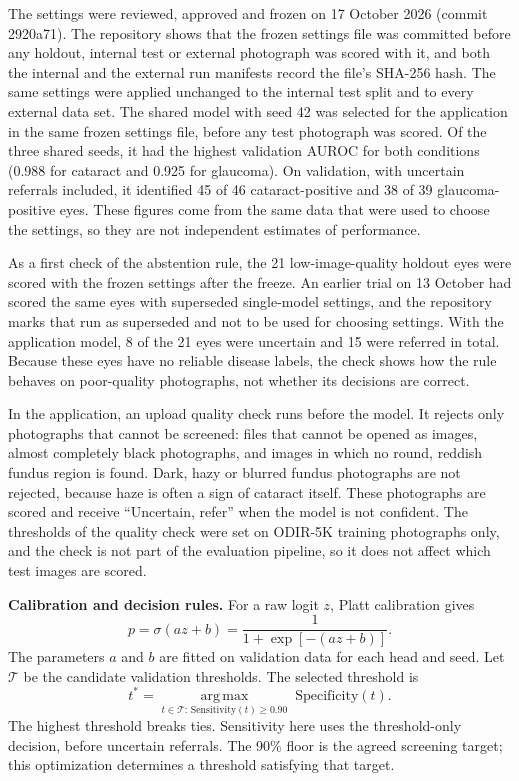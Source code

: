 \documentclass[conference,a4paper]{IEEEtran}
\newcommand{\peachaddition}[1]{%
  \par\smallskip\noindent
  \begingroup\setlength{\fboxsep}{5pt}%
  \colorbox{reviewpeach}{\begin{minipage}{\dimexpr\linewidth-2\fboxsep\relax}
  #1
  \end{minipage}}\endgroup\par\smallskip
}
\begin{document}
The settings were reviewed, approved and frozen on 17 October 2026 (commit 2920a71). The repository
shows that the frozen settings file was committed before any holdout, internal test or external
photograph was scored with it, and both the internal and the external run manifests record the
file's SHA-256 hash. The same settings were applied unchanged to the internal test split and to
every external data set. The shared model with seed 42 was selected for the application in the same
frozen settings file, before any test photograph was scored. Of the three shared seeds, it had the
highest validation AUROC for both conditions (0.988 for cataract and 0.925 for glaucoma). On
validation, with uncertain referrals included, it identified 45 of 46 cataract-positive and 38 of 39
glaucoma-positive eyes. These figures come from the same data that were used to choose the settings,
so they are not independent estimates of performance.

As a first check of the abstention rule, the 21 low-image-quality holdout eyes were scored with the
frozen settings after the freeze. An earlier trial on 13 October had scored the same eyes with
superseded single-model settings, and the repository marks that run as superseded and not to be used
for choosing settings. With the application model, 8 of the 21 eyes were uncertain and 15 were
referred in total. Because these eyes have no reliable disease labels, the check shows how the rule
behaves on poor-quality photographs, not whether its decisions are correct.

In the application, an upload quality check runs before the model. It rejects only photographs that
cannot be screened: files that cannot be opened as images, almost completely black photographs, and
images in which no round, reddish fundus region is found. Dark, hazy or blurred fundus photographs
are not rejected, because haze is often a sign of cataract itself. These photographs are scored and
receive ``Uncertain, refer'' when the model is not confident. The thresholds of the quality check
were set on ODIR-5K training photographs only, and the check is not part of the evaluation pipeline,
so it does not affect which test images are scored.


\peachaddition{
\textbf{Calibration and decision rules.}
For a raw logit $z$, Platt calibration gives
\[
p=\sigma(az+b)=\frac{1}{1+\exp[-(az+b)]}.
\]
The parameters $a$ and $b$ are fitted on validation data for each head and seed.
Let $\mathcal{T}$ be the candidate validation thresholds. The selected threshold is
\[
t^*=\underset{t\in\mathcal{T}:\,\mathrm{Sensitivity}(t)\geq0.90}
{\operatorname{arg\,max}}\;\mathrm{Specificity}(t).
\]
The highest threshold breaks ties. Sensitivity here uses the threshold-only
decision, before uncertain referrals. The 90\% floor is the agreed screening
target; this optimization determines a threshold satisfying that target.
}
\end{document}
